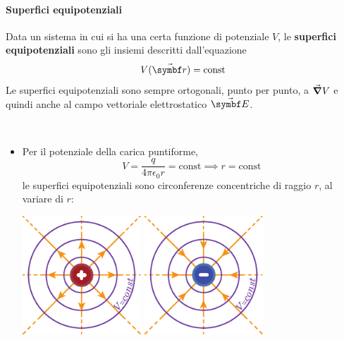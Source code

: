 \paragraph{Superfici equipotenziali}
\begin{define}
	Data un sistema in cui si ha una certa funzione di potenziale $V$, le \textbf{superfici equipotenziali} sono gli insiemi descritti dall'equazione
	\begin{equation}
		V(\vba{r})=\textrm{const}
	\end{equation}
	Le superfici equipotenziali sono sempre ortogonali, punto per punto, a $\grad{V}$ e quindi anche al campo vettoriale elettrostatico $\vba{E}$.
\end{define}
\begin{examples}~{}%
	\begin{itemize}
		\item Per il potenziale della carica puntiforme,
		\begin{equation*}
			V=\frac{q}{4\pi\epsilon_0r}=\mathrm{const}\implies r=\mathrm{const}
		\end{equation*}
		le superfici equipotenziali sono circonferenze concentriche di raggio $r$, al variare di $r$:
		\begin{center}
			\includegraphics[width=0.35\textwidth]{images/chp3/chp3potcampocoulomb1.pdf}\hspace{20pt}
			\includegraphics[width=0.35\textwidth]{images/chp3/chp3potcampocoulomb2.pdf}
		\end{center}

\end{itemize}
\end{examples}
